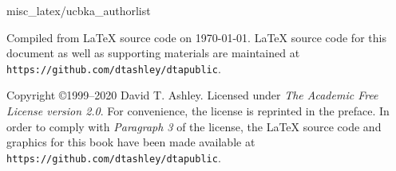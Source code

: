 \thispagestyle{empty}

\vspace*{1cm}
\begin{flushright}
\huge\bfseries
\ucbkatitle{}
\end{flushright}
\vspace{0.0cm}
\vfill
\begin{flushright}
\begin{small}
 {misc_latex/ucbka_authorlist}
\end{small}
\end{flushright}
\vspace{0.2cm}
\begin{flushright}
\begin{small}
Compiled from \LaTeX{} source code on \today{}.  
\LaTeX{} source code for this document as well as supporting materials
are maintained at \texttt{https://github.com/dtashley/dtapublic}.
\end{small}
\end{flushright}

\pagebreak
\thispagestyle{empty}
\begin{small}
  \noindent Copyright \copyright 1999--2020 David T. Ashley.
  Licensed under \emph{The Academic Free License version 2.0}.
  For convenience, the license is reprinted in the preface.
  In order to comply with \emph{Paragraph 3} of the license,
  the \LaTeX{} source code and graphics for this book have
  been made available at \texttt{https://github.com/dtashley/dtapublic}.
\end{small}

\vfill


